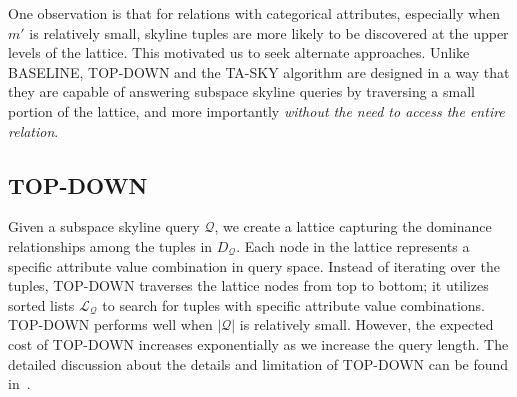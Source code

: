 One observation is that for relations with categorical attributes, especially when $m'$ is relatively small, skyline tuples are more likely to be discovered at the upper levels of the lattice. This motivated us to seek alternate approaches.
Unlike BASELINE, TOP-DOWN and the TA-SKY algorithm are designed in a way that they are capable of answering subspace skyline queries by traversing a small portion of the lattice, and more importantly {\em without the need to access the entire relation}.

\subsection{TOP-DOWN}\label{sec:topdown}

Given a subspace skyline query $\mathcal{Q}$, we create a lattice capturing the dominance relationships among the tuples in $D_{\mathcal{Q}}$. Each node in the lattice represents a specific attribute value combination in query space. Instead of iterating over the tuples, TOP-DOWN traverses the lattice nodes from top to bottom; it utilizes sorted lists $\mathcal{L_Q}$ to search for tuples with specific attribute value combinations. TOP-DOWN performs well when $|\mathcal{Q}|$ is relatively small. However, the expected cost of TOP-DOWN increases exponentially as we increase the query length. The detailed discussion about the details and limitation of  TOP-DOWN can be found in~\cite{TechReport}.

